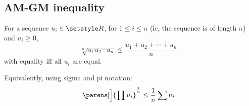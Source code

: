 \subsection{AM-GM inequality}

\begin{theorem}[AM-GM inequality]
 For a sequence \(u_i \in \Reals\), for \(1 \le i \le n\) (ie, the
 sequence is of length \(n\)) and \(u_i \ge 0\),
 \begin{equation*}
  \sqrt[n]{u_1 u_2 \dotsm u_n} \le \frac{u_1 + u_2 + \dotsb + u_n}n
 \end{equation*}
 with equality iff all \(u_i\) are equal.

 Equivalently, using sigma and pi notation:
 \begin{equation*}
  \parens[\Big]{\prod u_i}^\frac 1n \le \frac 1n\sum u_i
 \end{equation*}
\end{theorem}
